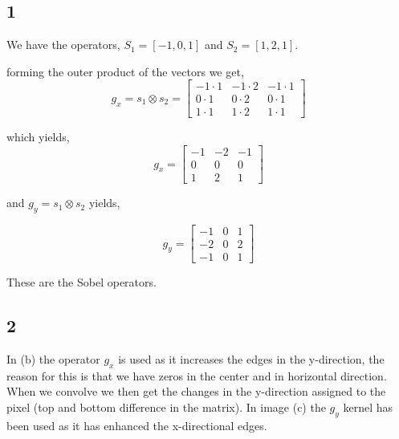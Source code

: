 {\subsection{1}

We have the operators, $S_{1} = [-1,0,1]$ and $S_{2} = [1,2,1]$.

forming the outer product of the vectors we get,
\begin{equation*}
    g_{x} = s_{1}\otimes s_{2} =     \begin{bmatrix}
        -1\cdot1       & -1\cdot2 & -1\cdot1 \\
         0\cdot1 & 0\cdot2 & 0\cdot1 \\
        1\cdot1 & 1\cdot2 & 1\cdot1
    \end{bmatrix}
\end{equation*}

which yields,
\begin{equation}
    g_{x}  = \begin{bmatrix}
        -1       & -2 & -1 \\
         0 & 0 & 0 \\
        1 & 2 & 1
    \end{bmatrix}
\end{equation}

and $g_{y} = s_{1}\otimes s_{2}$ yields,

\begin{equation}
    g_{y}  = \begin{bmatrix}
        -1       & 0 & 1 \\
         -2 & 0 & 2 \\
        -1 & 0 & 1
    \end{bmatrix}
\end{equation}

These are the Sobel operators.
\subsection{2}

In (b) the operator $g_{x}$ is used as it increases the edges in the y-direction, the reason for this is that we have zeros in the center and in horizontal direction. When we convolve we then get the changes in the y-direction assigned to the pixel (top and bottom difference in the matrix). In image (c) the $g_{y}$ kernel has been used as it has enhanced the x-directional edges.


}
